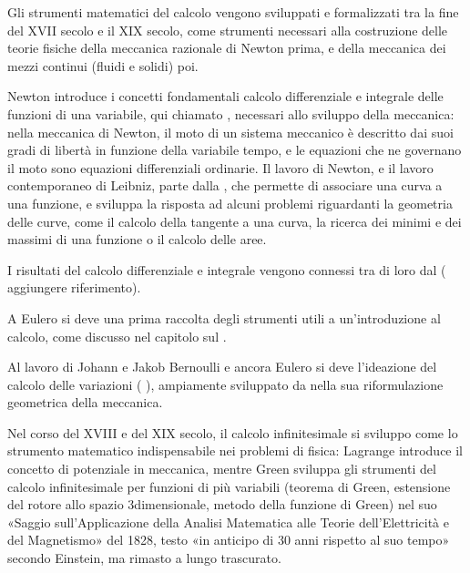 \documentclass[letterpaper,10pt,italian]{jupyterBook}
\begin{document}
\sphinxAtStartPar
Gli strumenti matematici del calcolo vengono sviluppati e formalizzati tra la fine del XVII secolo e il XIX secolo, come strumenti necessari alla costruzione delle teorie fisiche della meccanica razionale di Newton prima, e della meccanica dei mezzi continui (fluidi e solidi) poi.

\sphinxAtStartPar
Newton introduce i concetti fondamentali calcolo differenziale e integrale delle funzioni di una variabile, qui chiamato {\hyperref[\detokenize{ch/infinitesimal_calculus:infinitesimal-calculus}]{}}, necessari allo sviluppo della meccanica: nella meccanica di Newton, il moto di un sistema meccanico è descritto dai suoi gradi di libertà in funzione della variabile tempo, e le equazioni che ne governano il moto sono equazioni differenziali ordinarie. Il lavoro di Newton, e il lavoro contemporaneo di Leibniz, parte dalla {\hyperref[\detokenize{ch/analytic_geometry:geometry-analytic}]{}}, che permette di associare una curva a una funzione, e sviluppa la risposta ad alcuni problemi riguardanti la geometria delle curve, come il calcolo della tangente a una curva, la ricerca dei minimi e dei massimi di una funzione o il calcolo delle aree.

\sphinxAtStartPar
I risultati del calcolo differenziale e integrale vengono connessi tra di loro dal  ( aggiungere riferimento).

\sphinxAtStartPar
A Eulero si deve una prima raccolta degli strumenti utili a un’introduzione al calcolo, come discusso nel capitolo sul {\hyperref[\detokenize{ch/precalculus:math-hs-precalculus}]{}}.

\sphinxAtStartPar
Al lavoro di Johann e Jakob Bernoulli e ancora Eulero si deve l’ideazione del calcolo delle variazioni ( ), ampiamente sviluppato da  nella sua riformulazione geometrica della meccanica.

\sphinxAtStartPar
Nel corso del XVIII e del XIX secolo, il calcolo infinitesimale si sviluppo come lo strumento matematico indispensabile nei problemi di fisica: Lagrange introduce il concetto di potenziale in meccanica, mentre Green sviluppa gli strumenti del calcolo infinitesimale per funzioni di più variabili (teorema di Green, estensione del rotore allo spazio 3\sphinxhyphen{}dimensionale, metodo della funzione di Green) nel suo «Saggio sull’Applicazione della Analisi Matematica alle Teorie dell’Elettricità e del Magnetismo» del 1828, testo «in anticipo di 30 anni rispetto al suo tempo» secondo Einstein, ma rimasto a lungo trascurato.
\end{document}
